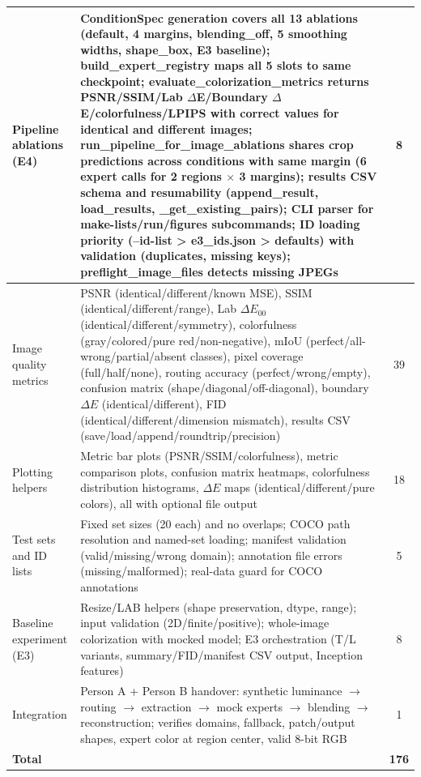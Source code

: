 \documentclass{FastFyp}
\begin{document}
\begin{longtable}{|p{3.4cm}|p{6.8cm}|c|}
Pipeline ablations (E4) & ConditionSpec generation covers all 13 ablations (default, 4 margins, blending\_off, 5 smoothing widths, shape\_box, E3 baseline); build\_expert\_registry maps all 5 slots to same checkpoint; evaluate\_colorization\_metrics returns PSNR/SSIM/Lab $\Delta$E/Boundary $\Delta$E/colorfulness/LPIPS with correct values for identical and different images; run\_pipeline\_for\_image\_ablations shares crop predictions across conditions with same margin (6 expert calls for 2 regions $\times$ 3 margins); results CSV schema and resumability (append\_result, load\_results, \_get\_existing\_pairs); CLI parser for make-lists/run/figures subcommands; ID loading priority (--id-list > e3\_ids.json > defaults) with validation (duplicates, missing keys); preflight\_image\_files detects missing JPEGs & 8 \\ \hline
Image quality metrics & PSNR (identical/different/known MSE), SSIM (identical/different/range), Lab $\Delta E_{00}$ (identical/different/symmetry), colorfulness (gray/colored/pure red/non-negative), mIoU (perfect/all-wrong/partial/absent classes), pixel coverage (full/half/none), routing accuracy (perfect/wrong/empty), confusion matrix (shape/diagonal/off-diagonal), boundary $\Delta E$ (identical/different), FID (identical/different/dimension mismatch), results CSV (save/load/append/roundtrip/precision) & 39 \\ \hline
Plotting helpers & Metric bar plots (PSNR/SSIM/colorfulness), metric comparison plots, confusion matrix heatmaps, colorfulness distribution histograms, $\Delta E$ maps (identical/different/pure colors), all with optional file output & 18 \\ \hline
Test sets and ID lists & Fixed set sizes (20 each) and no overlaps; COCO path resolution and named-set loading; manifest validation (valid/missing/wrong domain); annotation file errors (missing/malformed); real-data guard for COCO annotations & 5 \\ \hline
Baseline experiment (E3) & Resize/LAB helpers (shape preservation, dtype, range); input validation (2D/finite/positive); whole-image colorization with mocked model; E3 orchestration (T/L variants, summary/FID/manifest CSV output, Inception features) & 8 \\ \hline
Integration & Person A + Person B handover: synthetic luminance $\to$ routing $\to$ extraction $\to$ mock experts $\to$ blending $\to$ reconstruction; verifies domains, fallback, patch/output shapes, expert color at region center, valid 8-bit RGB & 1 \\ \hline
\textbf{Total} & & \textbf{176} \\ \hline
\end{longtable}
\end{document}

